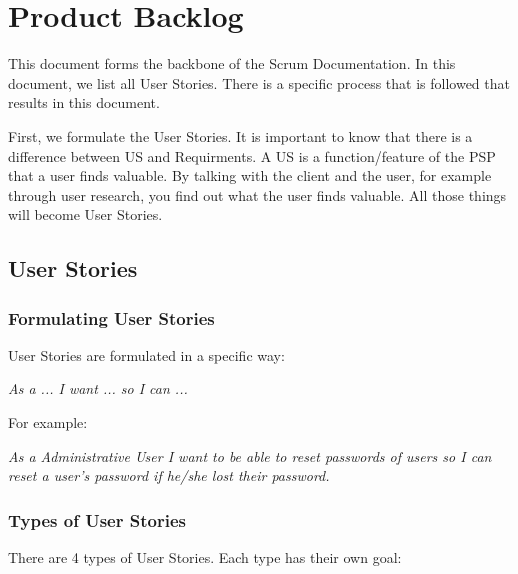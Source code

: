 \documentclass[10pt]{report}
\begin{document}
\newpage

\section{Product Backlog}

This document forms the backbone of the Scrum Documentation. In this document, we list all User Stories. There is a specific process that is followed that results in this document.

First, we formulate the User Stories. It is important to know that there is a difference between US and Requirments. A US is a function/feature of the PSP that a user finds valuable. By talking with the client and the user, for example through user research, you find out what the user finds valuable. All those things will become User Stories.

\subsection{User Stories}

\subsubsection{Formulating User Stories}

User Stories are formulated in a specific way:

\emph{As a ... I want ... so I can ...}

\noindent For example:

\emph{As a Administrative User I want to be able to reset passwords of users so I can reset a user's password if he/she lost their password.}

\subsubsection{Types of User Stories}

There are 4 types of User Stories. Each type has their own goal:
\end{document}
